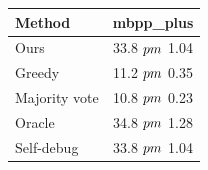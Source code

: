\begin{tabular}{lc}
\toprule
Method & mbpp_plus \\
\midrule
Ours & 33.8 $\\pm$ 1.04 \\
Greedy & 11.2 $\\pm$ 0.35 \\
Majority vote & 10.8 $\\pm$ 0.23 \\
Oracle & 34.8 $\\pm$ 1.28 \\
Self-debug & 33.8 $\\pm$ 1.04 \\
\bottomrule
\end{tabular}
